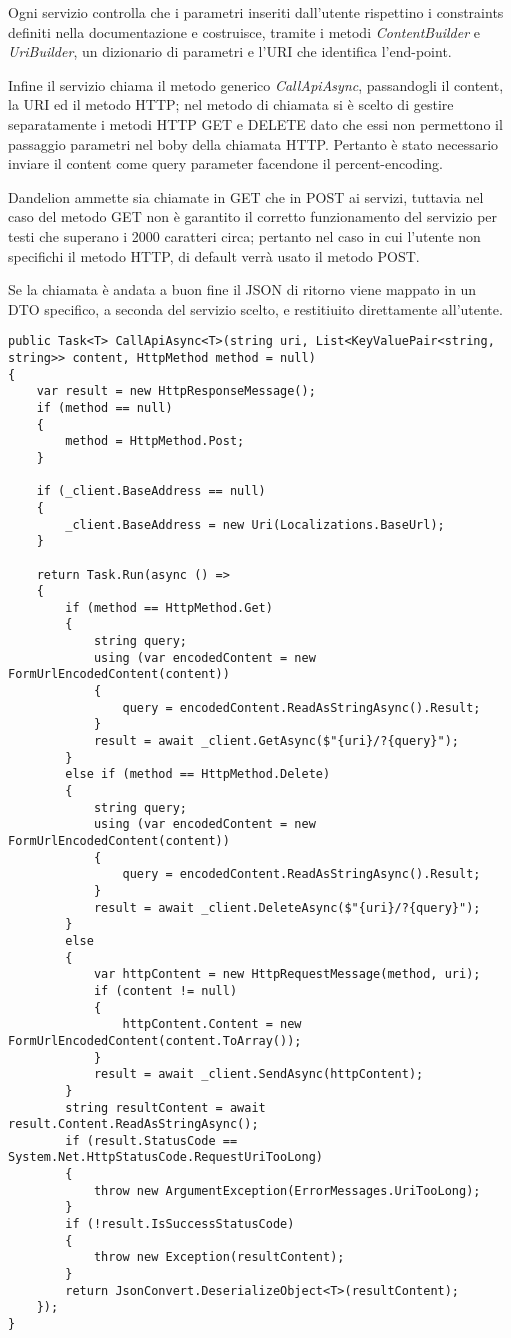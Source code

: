 Ogni servizio controlla che i parametri inseriti dall'utente rispettino i constraints definiti nella documentazione e costruisce, tramite i metodi \textit{ContentBuilder} e  
\textit{UriBuilder}, un dizionario di parametri e l'URI che identifica l'end-point. 

Infine il servizio chiama il metodo generico \textit{CallApiAsync}, passandogli il content, la URI ed il metodo HTTP; 
nel metodo di chiamata si è scelto di gestire separatamente i metodi HTTP GET e DELETE dato che essi non permettono il passaggio parametri nel boby 
della chiamata HTTP. Pertanto è stato necessario inviare il content come query parameter facendone il percent-encoding.

Dandelion ammette sia chiamate in GET che in POST ai servizi, tuttavia nel caso del metodo GET non è garantito il corretto 
funzionamento del servizio per testi che superano i 2000 caratteri circa; pertanto nel caso in cui l'utente non specifichi il metodo HTTP, di default verrà
usato il metodo POST.

Se la chiamata è andata a buon fine il JSON di ritorno viene mappato in un DTO specifico, a seconda del servizio scelto, e restitiuito direttamente all'utente.

\begin{lstlisting}[style=CSharpStyle]
public Task<T> CallApiAsync<T>(string uri, List<KeyValuePair<string, string>> content, HttpMethod method = null)
{
    var result = new HttpResponseMessage();
    if (method == null)
    {
        method = HttpMethod.Post;
    }

    if (_client.BaseAddress == null)
    {
        _client.BaseAddress = new Uri(Localizations.BaseUrl);
    }

    return Task.Run(async () =>
    {
        if (method == HttpMethod.Get)
        {
            string query;
            using (var encodedContent = new FormUrlEncodedContent(content))
            {
                query = encodedContent.ReadAsStringAsync().Result;
            }
            result = await _client.GetAsync($"{uri}/?{query}");
        }
        else if (method == HttpMethod.Delete)
        {
            string query;
            using (var encodedContent = new FormUrlEncodedContent(content))
            {
                query = encodedContent.ReadAsStringAsync().Result;
            }
            result = await _client.DeleteAsync($"{uri}/?{query}");
        }
        else
        {
            var httpContent = new HttpRequestMessage(method, uri);
            if (content != null)
            {
                httpContent.Content = new FormUrlEncodedContent(content.ToArray());
            }
            result = await _client.SendAsync(httpContent);
        }
        string resultContent = await result.Content.ReadAsStringAsync();
        if (result.StatusCode == System.Net.HttpStatusCode.RequestUriTooLong)
        {
            throw new ArgumentException(ErrorMessages.UriTooLong);
        }
        if (!result.IsSuccessStatusCode)
        {
            throw new Exception(resultContent); 
        }
        return JsonConvert.DeserializeObject<T>(resultContent);
    });
}
\end{lstlisting}

